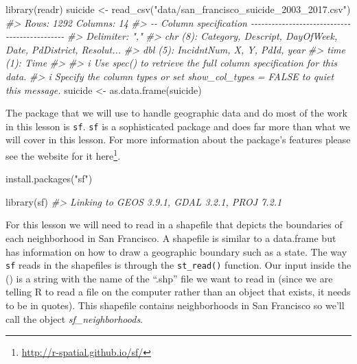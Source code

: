 \documentclass[
]{krantz}
\makeatletter
\newenvironment{Shaded}{\begin{snugshade}}{\end{snugshade}}
\newcommand{\CommentTok}[1]{\textcolor[rgb]{0.37,0.37,0.37}{\textit{#1}}}
\newcommand{\FunctionTok}[1]{\textcolor[rgb]{0,0,0}{#1}}
\newcommand{\NormalTok}[1]{#1}
\newcommand{\OtherTok}[1]{\textcolor[rgb]{0.37,0.37,0.37}{#1}}
\newcommand{\StringTok}[1]{\textcolor[rgb]{0.5,0.5,0.5}{#1}}
\renewcommand{\href}[2]{#2\footnote{\url{#1}}}
\newenvironment{kframe}{%
\medskip{}
\setlength{\fboxsep}{.8em}
 \def\at@end@of@kframe{}%
 \ifinner\ifhmode%
  \def\at@end@of@kframe{\end{minipage}}%
  \begin{minipage}{\columnwidth}%
 \fi\fi%
 \def\FrameCommand##1{\hskip\@totalleftmargin \hskip-\fboxsep
 \colorbox{shadecolor}{##1}\hskip-\fboxsep
     \hskip-\linewidth \hskip-\@totalleftmargin \hskip\columnwidth}%
 \MakeFramed {\advance\hsize-\width
   \@totalleftmargin\z@ \linewidth\hsize
   \@setminipage}}%
 {\par\unskip\endMakeFramed%
 \at@end@of@kframe}
\renewenvironment{Shaded}{\begin{kframe}}{\end{kframe}}
\makeatother
\begin{document}
\begin{Shaded}
\begin{Highlighting}[]
\FunctionTok{library}\NormalTok{(readr)}
\NormalTok{suicide }\OtherTok{\textless{}{-}} \FunctionTok{read\_csv}\NormalTok{(}\StringTok{"data/san\_francisco\_suicide\_2003\_2017.csv"}\NormalTok{)}
\CommentTok{\#\textgreater{} Rows: 1292 Columns: 14}
\CommentTok{\#\textgreater{} {-}{-} Column specification {-}{-}{-}{-}{-}{-}{-}{-}{-}{-}{-}{-}{-}{-}{-}{-}{-}{-}{-}{-}{-}{-}{-}{-}{-}{-}{-}{-}{-}{-}{-}{-}{-}{-}{-}{-}{-}{-}{-}{-}{-}{-}{-}{-}{-}{-}}
\CommentTok{\#\textgreater{} Delimiter: ","}
\CommentTok{\#\textgreater{} chr  (8): Category, Descript, DayOfWeek, Date, PdDistrict, Resolut...}
\CommentTok{\#\textgreater{} dbl  (5): IncidntNum, X, Y, PdId, year}
\CommentTok{\#\textgreater{} time (1): Time}
\CommentTok{\#\textgreater{} }
\CommentTok{\#\textgreater{} i Use \textasciigrave{}spec()\textasciigrave{} to retrieve the full column specification for this data.}
\CommentTok{\#\textgreater{} i Specify the column types or set \textasciigrave{}show\_col\_types = FALSE\textasciigrave{} to quiet this message.}
\NormalTok{suicide }\OtherTok{\textless{}{-}} \FunctionTok{as.data.frame}\NormalTok{(suicide)}
\end{Highlighting}
\end{Shaded}

The package that we will use to handle geographic data and do most of the work in this lesson is \texttt{sf}. \texttt{sf} is a sophisticated package and does far more than what we will cover in this lesson. For more information about the package's features please see the website for it \href{http://r-spatial.github.io/sf/}{here}.

\begin{Shaded}
\begin{Highlighting}[]
\FunctionTok{install.packages}\NormalTok{(}\StringTok{"sf"}\NormalTok{)}
\end{Highlighting}
\end{Shaded}

\begin{Shaded}
\begin{Highlighting}[]
\FunctionTok{library}\NormalTok{(sf)}
\CommentTok{\#\textgreater{} Linking to GEOS 3.9.1, GDAL 3.2.1, PROJ 7.2.1}
\end{Highlighting}
\end{Shaded}

For this lesson we will need to read in a shapefile that depicts the boundaries of each neighborhood in San Francisco. A shapefile is similar to a data.frame but has information on how to draw a geographic boundary such as a state. The way \texttt{sf} reads in the shapefiles is through the \texttt{st\_read()} function. Our input inside the () is a string with the name of the ``.shp'' file we want to read in (since we are telling R to read a file on the computer rather than an object that exists, it needs to be in quotes). This shapefile contains neighborhoods in San Francisco so we'll call the object \emph{sf\_neighborhoods}.
\end{document}
